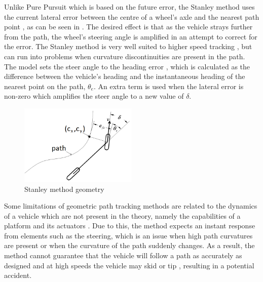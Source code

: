 \documentclass[main.tex]{subfiles}
\begin{document}
Unlike Pure Pursuit which is based on the future error, the Stanley method uses the current lateral error between the centre of a wheel's axle and the nearest path point \parencite{snider2009}, as can be seen in . The desired effect is that as the vehicle strays further from the path, the wheel's steering angle is amplified in an attempt to correct for the error. The Stanley method is very well suited to higher speed tracking \parencite{snider2009}, but can run into problems when curvature discontinuities are present in the path. The model sets the steer angle to the heading error \parencite{Giesbrecht2005}, which is calculated as the difference between the vehicle's heading and the instantaneous heading of the nearest point on the path, $\theta_e$. An extra term is used when the lateral error is non-zero which amplifies the steer angle to a new value of $\delta$.
\begin{figure}[ht]
\includegraphics[width=0.5\textwidth]{2-LiteratureReview/stanleyMethod.png}
\centering
\caption[Stanley method geometry]{Stanley method geometry \parencite{snider2009}} 
\end{figure}


Some limitations of geometric path tracking methods are related to the dynamics of a vehicle which are not present in the theory, namely the capabilities of a platform and its actuators \parencite{coulter1992}. Due to this, the method expects an instant response from elements such as the steering, which is an issue when high path curvatures are present or when the curvature of the path suddenly changes. As a result, the method cannot guarantee that the vehicle will follow a path as accurately as designed and at high speeds the vehicle may skid or tip \parencite{coulter1992}, resulting in a potential accident.
\end{document}
